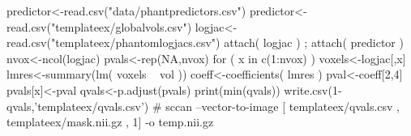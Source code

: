 predictor<-read.csv("data/phantpredictors.csv")
predictor<-read.csv("templateex/globalvols.csv")
logjac<-read.csv("templateex/phantomlogjacs.csv")
attach( logjac ) ; attach( predictor )
nvox<-ncol(logjac)
pvals<-rep(NA,nvox)
for ( x in c(1:nvox) ) 
{ 
  voxels<-logjac[,x]
  lmres<-summary(lm( voxels ~  vol ))
  coeff<-coefficients( lmres )
  pval<-coeff[2,4]
  pvals[x]<-pval
}
qvals<-p.adjust(pvals)
print(min(qvals))
write.csv(1-qvals,'templateex/qvals.csv')
# sccan --vector-to-image [ templateex/qvals.csv , templateex/mask.nii.gz , 1] -o temp.nii.gz

